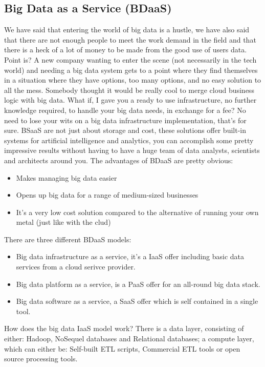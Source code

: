 \subsection{Big Data as a Service (BDaaS)}
We have said that entering the world of big data is a hustle, we have also said that there are not enough people to meet the work demand in the field and that there is a heck of a lot of money to be made from the good use of users data. \n
Point is? \n
A new company wanting to enter the scene (not necessarily in the tech world) and needing a big data system gets to a point where they find themselves in a situation where they have options, too many options, and no easy solution to all the mess. \n
Somebody thought it would be really cool to merge cloud business logic with big data. What if, I gave you a ready to use infrastructure, no further knowledge required, to handle your big data needs, in exchange for a fee? No need to lose your wits on a big data infrastructure implementation, that's for sure. \n
BSaaS are not just about storage and cost, these solutions offer built-in systems for artificial intelligence and analytics, you can accomplish some pretty impressive results without having to have a huge team of data analysts, scientists and architects around you. \n
The advantages of BDaaS are pretty obvious:
\begin{itemize}
    \item Makes managing big data easier
    \item Opens up big data for a range of medium-sized businesses
    \item It's a very low cost solution compared to the alternative of running your own metal (just like with the clud)
\end{itemize}
There are three different BDaaS models:
\begin{itemize}
    \item Big data infrastructure as a service, it's a IaaS offer including basic data services from a cloud serivce provider.
    \item Big data platform as a service, is a PaaS offer for an all-round big data stack.
    \item Big data software as a service, a SaaS offer which is self contained in a single tool.
\end{itemize}
How does the big data IaaS model work? There is a data layer, consisting of either: Hadoop, NoSequel databases and Relational databases; a compute layer, which can either be: Self-built ETL scripts, Commercial ETL tools or open source processing tools. \n
